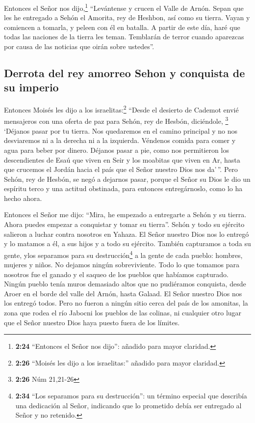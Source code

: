  Entonces el Señor nos dijo,\footnote{\textbf{2:24}
  ``Entonces el Señor nos dijo'': añadido para mayor claridad.}
``Levántense y crucen el Valle de Arnón. Sepan que les he entregado a
Sehón el Amorita, rey de Heshbon, así como su tierra. Vayan y comiencen
a tomarla, y peleen con él en batalla.  A partir de este
día, haré que todas las naciones de la tierra les teman. Temblarán de
terror cuando aparezcas por causa de las noticias que oirán sobre
ustedes''.

\hypertarget{derrota-del-rey-amorreo-sehon-y-conquista-de-su-imperio}{%
\subsection{Derrota del rey amorreo Sehon y conquista de su
imperio}\label{derrota-del-rey-amorreo-sehon-y-conquista-de-su-imperio}}

 Entonces Moisés les dijo a los israelitas:\footnote{\textbf{2:26}
  ``Moisés les dijo a los israelitas:'' añadido para mayor claridad.}
``Desde el desierto de Cademot envié mensajeros con una oferta de paz
para Sehón, rey de Hesbón, diciéndole, \footnote{\textbf{2:26} Núm
  21,21-26}  `Déjanos pasar por tu tierra. Nos quedaremos
en el camino principal y no nos desviaremos ni a la derecha ni a la
izquierda.  Véndenos comida para comer y agua para beber
por dinero. Déjanos pasar a pie,  como nos permitieron
los descendientes de Esaú que viven en Seir y los moabitas que viven en
Ar, hasta que crucemos el Jordán hacia el país que el Señor nuestro Dios
nos da'\,''.  Pero Sehón, rey de Hesbón, se negó a
dejarnos pasar, porque el Señor su Dios le dio un espíritu terco y una
actitud obstinada, para entonces entregárnoslo, como lo ha hecho ahora.

 Entonces el Señor me dijo: ``Mira, he empezado a
entregarte a Sehón y su tierra. Ahora puedes empezar a conquistar y
tomar su tierra''.  Sehón y todo su ejército salieron a
luchar contra nosotros en Yahaza.  El Señor nuestro Dios
nos lo entregó y lo matamos a él, a sus hijos y a todo su ejército.
 También capturamos a toda su gente, ylos separamos para
su destrucción\footnote{\textbf{2:34} ``Los separamos para su
  destrucción'': un término especial que describía una dedicación al
  Señor, indicando que lo prometido debía ser entregado al Señor y no
  retenido.} a la gente de cada pueblo: hombres, mujeres y niños. No
dejamos ningún sobreviviente.  Todo lo que tomamos para
nosotros fue el ganado y el saqueo de los pueblos que habíamos
capturado.  Ningún pueblo tenía muros demasiado altos que
no pudiéramos conquista, desde Aroer en el borde del valle del Arnón,
hasta Galaad. El Señor nuestro Dios nos los entregó todos.
 Pero no fueron a ningún sitio cerca del país de los
amonitas, la zona que rodea el río Jabocni los pueblos de las colinas,
ni cualquier otro lugar que el Señor nuestro Dios haya puesto fuera de
los límites.

